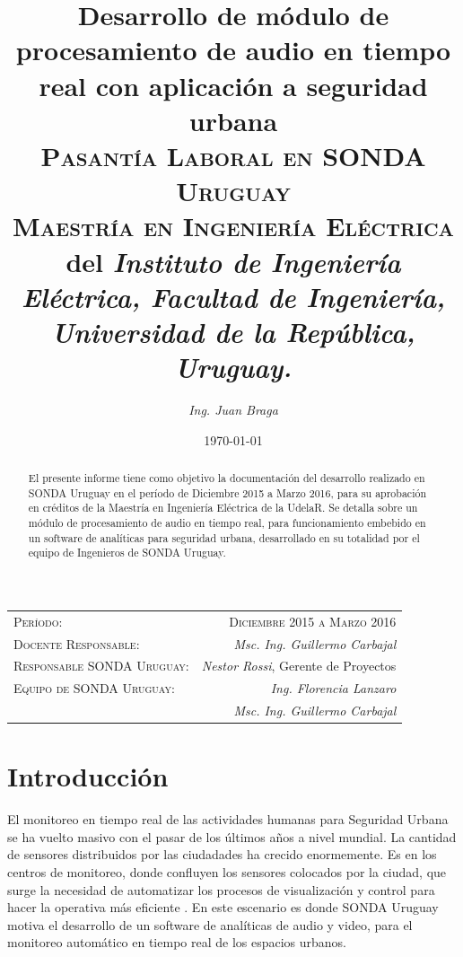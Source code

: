 \documentclass{article}
\title{\textbf{Desarrollo de módulo de procesamiento de audio en tiempo real con aplicación a seguridad urbana}\\ \textsc{Pasantía Laboral en SONDA Uruguay}\\
\large \textsc{Maestría en Ingeniería Eléctrica} del \textit{Instituto de Ingeniería Eléctrica, Facultad de Ingeniería, Universidad de la República, Uruguay.}}
\author{\textit{Ing. Juan Braga}}
\date{\today}
\begin{document}
\maketitle 

\begin{center}
\begin{tabular}{l r}
\medskip
\textsc{Período:} & \textsc{Diciembre 2015 a Marzo 2016}\\ %
\textsc{Docente Responsable:} & \textit{Msc. Ing. Guillermo Carbajal} \\ 
\textsc{Responsable SONDA Uruguay:} & \textit{Nestor Rossi}, Gerente de Proyectos  \\
\textsc{Equipo de SONDA Uruguay:} & \textit{Ing. Florencia Lanzaro} \\ & \textit{Msc. Ing. Guillermo Carbajal} \\ 
\end{tabular}
\end{center}


\begin{abstract}
El presente informe tiene como objetivo la documentación del desarrollo realizado en SONDA Uruguay en el período de Diciembre 2015 a Marzo 2016, para su aprobación en créditos de la Maestría en Ingeniería Eléctrica de la UdelaR. Se detalla sobre un módulo de procesamiento de audio en tiempo real, para funcionamiento embebido en un software de analíticas para seguridad urbana, desarrollado en su totalidad por el equipo de Ingenieros de SONDA Uruguay. 
\end{abstract}


\section{Introducción}
El monitoreo en tiempo real de las actividades humanas para Seguridad Urbana se ha vuelto masivo con el pasar de los últimos años a nivel mundial. La cantidad de sensores distribuidos por las ciudadades ha crecido enormemente. Es en los centros de monitoreo, donde confluyen los sensores colocados por la ciudad, que surge la necesidad de automatizar los procesos de visualización y control para hacer la operativa más eficiente \citep{Crocco:2016:ASS:2891449.2871183}. En este escenario es donde SONDA Uruguay motiva el desarrollo de un software de analíticas de audio y video, para el monitoreo automático en tiempo real de los espacios urbanos.   
\end{document}
